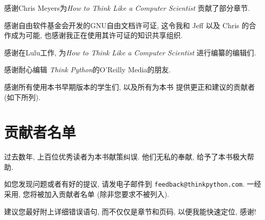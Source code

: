 \documentclass[10pt]{book}
\begin{document}
感谢Chris Meyers为{\em How to Think Like a Computer Scientist}
贡献了部分章节. 

感谢自由软件基金会开发的GNU自由文档许可证, 
这令我和 Jeff 以及 Chris 的合作成为可能,
也感谢我正在使用其许可证的知识共享组织. 

感谢在Lulu工作, 为{\em How to Think Like a Computer Scientist}
进行编纂的编辑们. 

感谢耐心编辑 {\em Think Python}的O'Reilly Media的朋友. 

感谢所有使用本书早期版本的学生们, 以及所有为本书
提供更正和建议的贡献者(如下所列). 

\section*{贡献者名单}

过去数年, 上百位优秀读者为本书献策纠误. 
他们无私的奉献, 给予了本书极大帮助. 

如您发现问题或者有好的提议, 请发电子邮件到 
{\tt feedback@thinkpython.com}. 一经采用, 您将被加入贡献者名单
(除非您要求不被列入).

建议您最好附上详细错误语句, 而不仅仅是章节和页码, 以便我能快速定位, 感谢!
\end{document}
